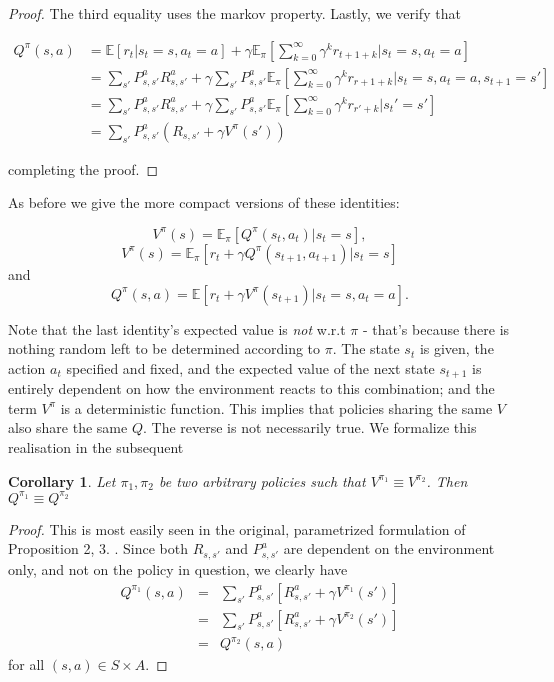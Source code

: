 \documentclass[11pt]{article} %
\newtheorem{cor}{Corollary}
\begin{document}
\begin{proof}
	The third equality uses the markov property. Lastly, we verify that

	\[
		\begin{array}{rl}
			Q^{\pi}(s,a)  	& = \mathbb{E}[r_t | s_t = s, a_t = a] + \gamma \mathbb{E}_{\pi}[\sum_{k=0}^{\infty} \gamma^k r_{t+1+k} | s_t = s, a_t = a] \\
						& = \sum_{s'} P_{s,s'}^a R_{s,s'}^a + \gamma \sum_{s'} P_{s,s'}^a \mathbb{E}_{\pi}[\sum_{k=0}^{\infty} \gamma^k r_{r+1+k} | s_t = s, a_t = a, s_{t+1} = s'] \\
						& = \sum_{s'} P_{s,s'}^a R_{s,s'}^a + \gamma \sum_{s'} P_{s,s'}^a \mathbb{E}_{\pi}[\sum_{k=0}^{\infty} \gamma^k r_{r'+k} | s_t' = s'] \\
						& = \sum_{s'} P_{s,s'}^a ( R_{s,s'} + \gamma V^{\pi}(s') )
		\end{array}
	\]

	completing the proof.

\end{proof}

As before we give the more compact versions of these identities:

$$ V^{\pi}(s) =  \mathbb{E}_{\pi}[Q^{\pi}(s_{t},a_{t}) | s_t = s ], $$
$$ V^{\pi}(s) =  \mathbb{E}_{\pi}[r_t + \gamma Q^{\pi}(s_{t+1},a_{t+1}) | s_t = s ] $$ and 
$$ Q^{\pi}(s,a) = \mathbb{E}[r_t + \gamma V^{\pi}(s_{t+1}) | s_t = s, a_t = a]. $$

Note that the last identity's expected value is \textit{not} w.r.t $\pi$ - that's because there is nothing random left to be determined according to $\pi$. The state $s_t$ is given, the action $a_t$ specified and fixed, and the expected value of the next state $s_{t+1}$ is entirely dependent on how the environment reacts to this combination; and the term $V^{\pi}$ is a deterministic function. This implies that policies sharing the same $V$ also share the same $Q$. The reverse is not necessarily true. We formalize this realisation in the subsequent

\begin{cor}\label{cor_sameVSameQ}
	Let $\pi_1,\pi_2$ be two arbitrary policies such that $V^{\pi_1} \equiv V^{\pi_2}$. Then $Q^{\pi_1} \equiv Q^{\pi_2}$
\end{cor}

\begin{proof}
	This is most easily seen in the original, parametrized formulation of Proposition 2, 3. . Since both $R_{s,s'}$ and $P_{s,s'}^a$ are dependent on the environment only, and not on the policy in question, we clearly have
	\[
		\begin{array}{rll}
			Q^{\pi_1}(s,a) & = &  \sum_{s'} P_{s,s'}^a [ R_{s,s'}^a + \gamma V^{\pi_1}(s') ] \\
						& = & \sum_{s'} P_{s,s'}^a [ R_{s,s'}^a + \gamma V^{\pi_2}(s') ] \\
						& = & Q^{\pi_2}(s,a)
		\end{array}
	\]
	for all $(s,a) \in S \times A$.
\end{proof}
\end{document}
